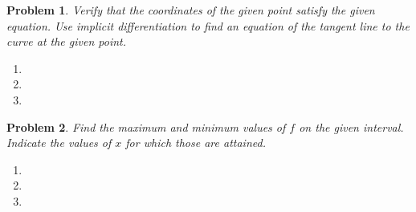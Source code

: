 \documentclass{article}
\renewcommand{\fcProblemRef}{\theproblem.\theenumi}
\newtheorem{problem}{Problem}
\begin{document}
\begin{problem}Verify that the coordinates of the given point satisfy the given equation. Use implicit differentiation to find an equation of the tangent line to the curve at the given point.

\begin{enumerate}[ref={\fcProblemRef}]
\item 
\item 
\item 

\end{enumerate}
\end{problem}

\begin{problem}
Find the maximum and minimum values of $f$ on the given interval. Indicate the values of $x$ for which those are attained.
\begin{enumerate}[ref={\fcProblemRef}]
\item 
\item 
\item 
\end{enumerate}
\end{problem}

%
\end{document}
